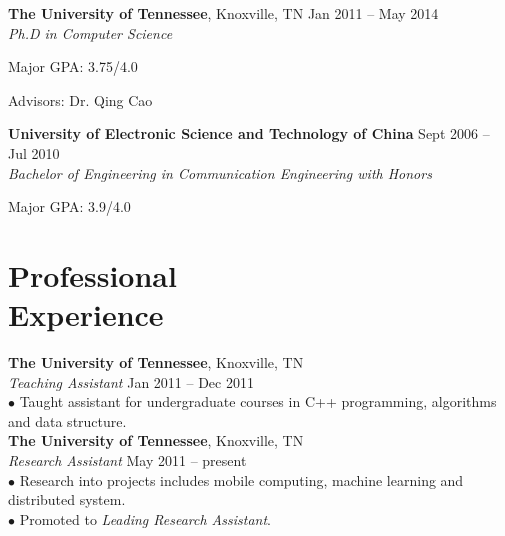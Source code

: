 \documentclass[margin, centered]{resume}
\begin{document}
\begin{resume}
    \textbf{The University of Tennessee}, Knoxville, TN \hfill Jan 2011 -- May 2014\vspace{0mm}\\\vspace{0mm}%
    \emph{Ph.D in Computer Science} \vspace{-1mm}\\\vspace{-2mm}%
    \begin{list2}
        \item Major GPA: 3.75/4.0
        \item Advisors:  Dr. Qing Cao
    \end{list2}\vspace{-1mm}
    \textbf{University of Electronic Science and Technology of China} \hfill Sept 2006 -- Jul 2010\vspace{0mm}\\\vspace{0mm}%
	\emph{Bachelor of Engineering in Communication Engineering with Honors} \vspace{-1mm}\\\vspace{-2mm}%
	\begin{list2}
		\item Major GPA: 3.9/4.0
	\end{list2}\vspace{3mm} 

    \section{\mysidestyle Professional\\Experience}

    \textbf{The University of Tennessee}, Knoxville, TN \\\vspace{0mm}%
    \emph{Teaching Assistant} \hfill Jan 2011 -- Dec 2011\vspace{0mm}\\
    $\bullet$ Taught assistant for undergraduate courses in C++ programming, algorithms and data structure.\vspace{-5mm}\\
	
    \textbf{The University of Tennessee}, Knoxville, TN \\\vspace{0mm}%
    \emph{Research Assistant} \hfill May 2011 -- present\vspace{0mm}\\
    $\bullet$ Research into projects includes mobile computing, machine learning and distributed system.\vspace{0mm}\\
    $\bullet$ Promoted to \textsl{Leading Research Assistant}.\vspace{-5mm}\\


\end{resume}
\end{document}
